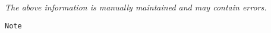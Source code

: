 \label{pkg:note}

{\tiny \it The above information is manually maintained and may contain errors.}
\begin{verbatim}
Note
\end{verbatim}

